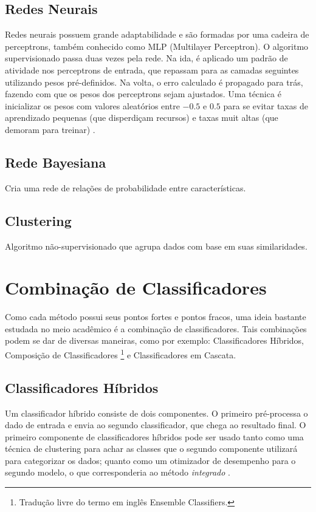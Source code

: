     \subsection{Redes Neurais}
    Redes neurais possuem grande adaptabilidade e são formadas por uma cadeira de perceptrons, também conhecido como MLP
    (Multilayer Perceptron). O algoritmo supervisionado passa duas vezes pela rede. Na ida, é aplicado um padrão de
    atividade nos perceptrons de entrada, que repassam para as camadas seguintes utilizando pesos pré-definidos. Na volta,
     o erro calculado é propagado para trás, fazendo com que os pesos dos perceptrons sejam ajustados.
     Uma técnica é inicializar os pesos com valores aleatórios entre $-0.5$ e $0.5$ para se evitar taxas de aprendizado
     pequenas (que disperdiçam recursos) e taxas muit altas (que demoram para treinar) \cite{barapatre08}.

    \subsection{Rede Bayesiana}
        Cria uma rede de relações de probabilidade entre características.

    \subsection{Clustering}
        Algoritmo não-supervisionado que agrupa dados com base em suas similaridades.

\section{Combinação de Classificadores}
Como cada método possui seus pontos fortes e pontos fracos, uma ideia bastante estudada no meio acadêmico é a
 combinação de classificadores. Tais combinações podem se dar de diversas maneiras, como por exemplo: Classificadores
 Híbridos, Composição de Classificadores \footnote{Tradução livre do termo em inglês Ensemble Classifiers.} e
 Classificadores em Cascata.

 \subsection{Classificadores Híbridos}
    Um classificador híbrido consiste de dois componentes. O primeiro pré-processa o dado de entrada e envia ao segundo
    classificador, que chega ao resultado final. O primeiro componente de classificadores híbridos pode ser usado tanto
    como uma técnica de clustering para achar as classes que o segundo componente utilizará para categorizar os dados;
    quanto como um otimizador de desempenho para o segundo modelo, o que corresponderia ao método \textit{integrado}
    \cite{aydin09}.


